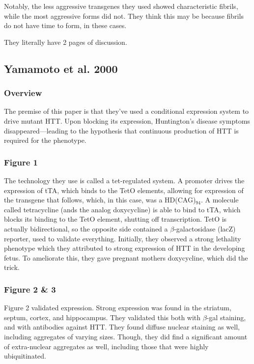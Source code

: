 \documentclass[12pt]{report}
\begin{document}
Notably, the less aggressive transgenes they used showed characteristic fibrils, while the most aggressive forms did not. They think this may be because fibrils do not have time to form, in these cases.\newline


They literally have 2 pages of discussion.

\subsection{Yamamoto et al. 2000}

\subsubsection{Overview}

The premise of this paper is that they've used a conditional expression system to drive mutant HTT. Upon blocking its expression, Huntington's disease symptoms disappeared---leading to the hypothesis that continuous production of HTT is required for the phenotype. 

\subsubsection{Figure 1}

The technology they use is called a tet-regulated system. A promoter drives the expression of tTA, which binds to the TetO elements, allowing for expression of the transgene that follows, which, in this case, was a HD(CAG)$_{94}$. A molecule called tetracycline (ands the analog doxycycline) is able to bind to tTA, which blocks its binding to the TetO element, shutting off transcription. TetO is actually bidirectional, so the opposite side contained a $\beta$-galactosidase (lacZ) reporter, used to validate everything. Initially, they observed a strong lethality phenotype which they attributed to strong expression of HTT in the developing fetus. To ameliorate this, they gave pregnant mothers doxycycline, which did the trick. 

\subsubsection{Figure 2 \& 3}

Figure 2 validated expression. Strong expression was found in the striatum, septum, cortex, and hippocampus. They validated this both with $\beta$-gal staining, and with antibodies against HTT. They found diffuse nuclear staining as well, including aggregates of varying sizes. Though, they did find a significant amount of extra-nuclear aggregates as well, including those that were highly ubiquitinated.\newline
\end{document}
